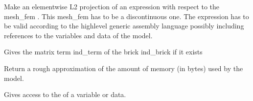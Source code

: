 \documentclass[a4paper,11pt,english]{sphinxmanual}
\begin{document}
\begin{fulllineitems}
\begin{fulllineitems}
\label{\detokenize{python/cmdref_Model:getfem.Model.local_projection}}
Make an elementwise L2 projection of an expression with respect
to the mesh\_fem . This mesh\_fem has to be
a discontinuous one.
The expression has to be valid according to the high\sphinxhyphen{}level generic
assembly language possibly including references to the variables
and data of the model.

\end{fulllineitems}


\begin{fulllineitems}
\label{\detokenize{python/cmdref_Model:getfem.Model.matrix_term}}
Gives the matrix term ind\_term of the brick ind\_brick if it exists

\end{fulllineitems}


\begin{fulllineitems}
\label{\detokenize{python/cmdref_Model:getfem.Model.memsize}}
Return a rough approximation of the amount of memory (in bytes) used by
the model.

\end{fulllineitems}


\begin{fulllineitems}
\label{\detokenize{python/cmdref_Model:getfem.Model.mesh_fem_of_variable}}
Gives access to the  of a variable or data.

\end{fulllineitems}



\end{fulllineitems}
\end{document}
